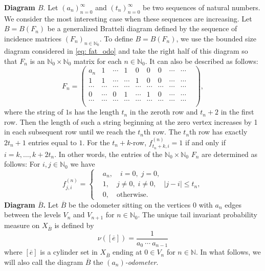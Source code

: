 \documentclass[11pt,reqno]{amsart}
\theoremstyle{definition}
\theoremstyle{remark}
\theoremstyle{plain}
\def\ol{\overline}
\newcommand{\N}{\mathbb N}
\numberwithin{equation}{section}
\begin{document}
\textbf{Diagram $B.$} 
Let $(a_n)_{n=0}^{\infty}$ and $(t_n)_{n=0}^{\infty}$ be two sequences of natural numbers. We consider the most interesting case when these sequences are increasing. Let $B = B(F_n)$ be a generalized Bratteli diagram defined by the 
sequence of incidence matrices $(F_n)_{n \in \N_0}$. To define $B= B(F_n)$, we use the bounded size diagram considered in \eqref{eq: fat_odo} and take the right half of this diagram so that $F_n$ is an $\N_0 \times \N_0$ matrix for each $n \in \N_0$. It can also be described as follows:
$$
F_n = \begin{pmatrix}
    a_n & 1 & \cdots & 1 & 0 & 0 & 0 & \cdots & \cdots \\
    1 & 1 &  \cdots  & \cdots & 1 & 0 & 0 & \cdots & \cdots\\
    \cdots & \cdots & \cdots & \cdots & \cdots & \cdots & \cdots & \cdots & \cdots & \\
0 & \cdots & 0 & 1 & \cdots & 1 & 0 &\cdots &\cdots \\
\cdots & \cdots & \cdots & \cdots & \cdots & \cdots & \cdots & \cdots & \cdots & \\
\end{pmatrix},
$$
where the string of $1$s has the length $t_n$ in the zeroth row and $t_n +2$ in the first row. Then the length of such a string beginning at the zero vertex increases by 1 in each subsequent row until we reach the $t_n$th row. The $t_n$th row has exactly $2t_n +1$ entries equal to $1$. For the $t_n +k$-row, $f^{(n)}_{t_n+ k, i} =1$ if and only if $i = k, \ldots, k + 2t_n$. In other words, the entries of the $\N_0 \times \N_0$ $F_n$ are determined as follows: For $i,j \in \N_0$ we have
\[
f_{j,i}^{(n)} =
\left\{
\begin{aligned}
&a_n, \quad i = 0,\;  j = 0,\\
&1, \quad j \neq 0,\; i\neq 0, \quad |j - i| \leq t_n,\\
&0, \quad \mbox{otherwise}.
\end{aligned}
\right.
\]
\textbf{Diagram $\ol B$.} Let $\ol B$ be the odometer sitting on the vertices $0$ with $a_n$ edges between the levels $V_n$ and $V_{n+1}$ for $n \in \N_0$. The unique tail invariant probability measure on $X_{\ol B}$ is defined by 
$$
\nu([\ol e]) = \frac{1}{a_0 \ \cdots\ a_{n-1}} 
$$
where $[\ol e]$ is a cylinder set in $X_{\ol B}$ ending at $0 \in V_{n}$ for $n \in \N$. In what follows, we will also call the diagram $\ol B$ the \textit{$(a_n)$-odometer}.
\end{document}
